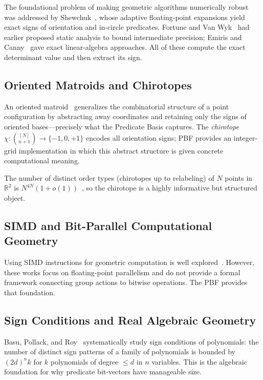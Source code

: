 \documentclass[11pt,letterpaper]{article}
\newcommand{\RR}{\mathbb{R}}
\begin{document}
The foundational problem of making geometric algorithms numerically robust was
addressed by Shewchuk~\cite{Shewchuk97}, whose adaptive floating-point expansions
yield exact signs of orientation and in-circle predicates.  Fortune and Van
Wyk~\cite{Fortune93} had earlier proposed static analysis to bound intermediate
precision; Emiris and Canny~\cite{Emiris92} gave exact linear-algebra approaches.
All of these compute the exact determinant value and then extract its sign.

\subsection{Oriented Matroids and Chirotopes}

An oriented matroid~\cite{Bjorner99} generalizes the combinatorial structure of a
point configuration by abstracting away coordinates and retaining only the signs of
oriented bases---precisely what the Predicate Basis captures.  The \emph{chirotope}
$\chi:\binom{[N]}{n+1}\to\{-1,0,+1\}$ encodes all orientation signs; PBF provides
an integer-grid implementation in which this abstract structure is given concrete
computational meaning.

The number of distinct order types (chirotopes up to relabeling) of $N$ points in
$\RR^2$ is $N^{4N}(1+o(1))$~\cite{Aichholzer07}, so the chirotope is a highly
informative but structured object.

\subsection{SIMD and Bit-Parallel Computational Geometry}

Using SIMD instructions for geometric computation is well
explored~\cite{Aftosmis03,Karras12,Green12}.  However, these works focus on
floating-point parallelism and do not provide a formal framework connecting group
actions to bitwise operations.  The PBF provides that foundation.

\subsection{Sign Conditions and Real Algebraic Geometry}

Basu, Pollack, and Roy~\cite{Basu06} systematically study sign conditions of
polynomials: the number of distinct sign patterns of a family of polynomials is bounded
by $(2d)^n k$ for $k$ polynomials of degree $\le d$ in $n$ variables.  This is the
algebraic foundation for why predicate bit-vectors have manageable size.
\end{document}
